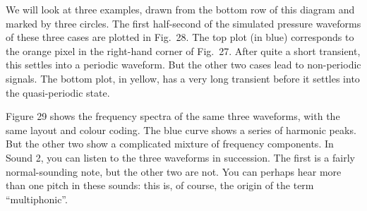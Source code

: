 
  We will look at three examples, drawn from the bottom row of this diagram and 
  marked by three circles. The first half-second of the simulated pressure 
  waveforms of these three cases are plotted in Fig.\ 28. The top plot (in 
  blue) corresponds to the orange pixel in the right-hand corner of Fig.\ 27. 
  After quite a short transient, this settles into a periodic waveform. But the 
  other two cases lead to non-periodic signals. The bottom plot, in yellow, has 
  a very long transient before it settles into the quasi-periodic state. 


  Figure 29 shows the frequency spectra of the same three waveforms, with the 
  same layout and colour coding. The blue curve shows a series of harmonic 
  peaks. But the other two show a complicated mixture of frequency components. 
  In Sound 2, you can listen to the three waveforms in succession. The first is 
  a fairly normal-sounding note, but the other two are not. You can perhaps 
  hear more than one pitch in these sounds: this is, of course, the origin of 
  the term “multiphonic”. 


\audio{}

